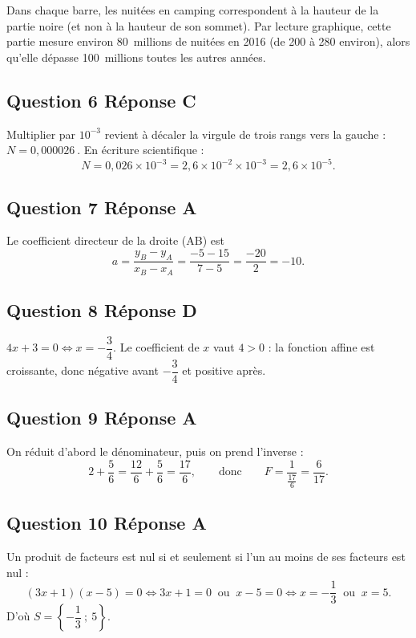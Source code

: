 \documentclass[10pt]{article}
\providecommand{\np}[2][]{{#2~#1}}
\begin{document}
Dans chaque barre, les nuitées en camping correspondent à la hauteur de la partie
noire (et non à la hauteur de son sommet). Par lecture graphique, cette partie mesure
environ 80~millions de nuitées en 2016 (de 200 à 280 environ), alors qu'elle dépasse
100~millions toutes les autres années.

\subsection*{Question 6 \quad Réponse C}

Multiplier par $10^{-3}$ revient à décaler la virgule de trois rangs vers la gauche :
$N = \np{0,000026}$. En écriture scientifique :
\[N = 0,026 \times 10^{-3} = 2,6 \times 10^{-2} \times 10^{-3} = 2,6 \times 10^{-5}.\]

\subsection*{Question 7 \quad Réponse A}

Le coefficient directeur de la droite (AB) est
\[a = \dfrac{y_B - y_A}{x_B - x_A} = \dfrac{-5 - 15}{7 - 5} = \dfrac{-20}{2} = -10.\]

\subsection*{Question 8 \quad Réponse D}

$4x + 3 = 0 \iff x = -\dfrac{3}{4}$. Le coefficient de $x$ vaut $4 > 0$ : la fonction
affine est croissante, donc négative avant $-\dfrac{3}{4}$ et positive après.

\subsection*{Question 9 \quad Réponse A}

On réduit d'abord le dénominateur, puis on prend l'inverse :
\[2 + \dfrac{5}{6} = \dfrac{12}{6} + \dfrac{5}{6} = \dfrac{17}{6},
\qquad\text{donc}\qquad
F = \dfrac{1}{\frac{17}{6}} = \dfrac{6}{17}.\]

\subsection*{Question 10 \quad Réponse A}

Un produit de facteurs est nul si et seulement si l'un au moins de ses facteurs est nul :
\[(3x+1)(x-5) = 0 \iff 3x + 1 = 0 \ \text{ ou } \ x - 5 = 0
\iff x = -\dfrac{1}{3} \ \text{ ou } \ x = 5.\]
D'où $S = \left\{-\dfrac{1}{3}~;~5\right\}$.
\end{document}
